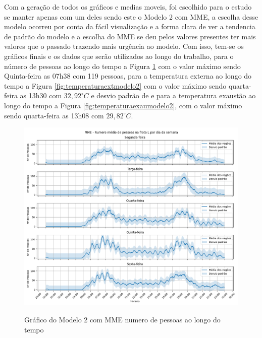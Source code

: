 \documentclass[acronym,symbols,table]{fei}
\begin{document}
\newpage 

Com a geração de todos os gráficos e medias moveis, foi escolhido para o estudo se manter apenas com um deles sendo este o Modelo 2 com MME, a escolha desse modelo ocorreu por conta da fácil visualização e a forma clara de ver a tendencia de padrão do modelo e a escolha do MME se deu pelos valores presentes ter mais valores que o passado trazendo mais urgência ao modelo. Com isso, tem-se os gráficos finais e os dados que serão utilizados ao longo do trabalho, para o número de pessoas ao longo do tempo a Figura \ref{fig:numeromodelo2} com o valor máximo sendo Quinta-feira as 07h38 com 119 pessoas, para a temperatura externa ao longo do tempo a Figura \ref{fig:temperaturaextmodelo2} com o valor máximo sendo quarta-feira as 13h30 com $32,92 ^\circ C$ e desvio padrão de e para a temperatura exaustão ao longo do tempo a Figura \ref{fig:temperaturaexaumodelo2}, com o valor máximo sendo quarta-feira as 13h08 com $29,82 ^\circ C$.

\begin{figure}[!htb]
	    \centering
	    \caption{Gráfico do Modelo 2 com MME numero de pessoas ao longo do tempo}
        \includegraphics[width=0.8\linewidth]{Imagens/MME_-_Numero_medio_de_pessoas_na_frota_L_por_dia_da_semana_desvio_padrao.png}
        \label{fig:numeromodelo2}
\end{figure}
\end{document}
